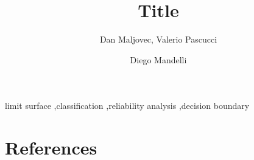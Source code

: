 \documentclass{elsarticle}
\begin{document}
\begin{frontmatter}

\title{Title}

\author{Dan Maljovec, Valerio Pascucci}
\address{test Address Authors 1}

\author{Diego Mandelli}
\address{test Address Authors 2}

\begin{abstract}
  
\end{abstract}

\begin{keyword}
limit surface \sep classification \sep reliability analysis \sep decision boundary
\end{keyword}

\end{frontmatter}

\linenumbers

\printnomenclature[1in]








\section*{References}


\end{document}
